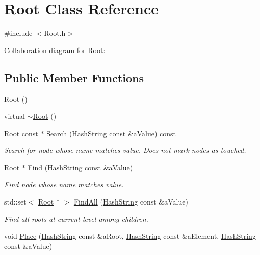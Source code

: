 \hypertarget{classRoot}{}\section{Root Class Reference}
\label{classRoot}


{\ttfamily \#include $<$Root.\+h$>$}



Collaboration diagram for Root\+:
\subsection*{Public Member Functions}
\begin{DoxyCompactItemize}
\item 
\hyperlink{classRoot_ae30f3c6144d2d9df894b392ee45d051f}{Root} ()
\item 
virtual \hyperlink{classRoot_ae3b9dd56ac40d582a92b904f8480be7b}{$\sim$\+Root} ()
\item 
\hyperlink{classRoot}{Root} const $\ast$ \hyperlink{classRoot_a47a028763d0583b91ec52e580f406548}{Search} (\hyperlink{classHashString}{Hash\+String} const \&a\+Value) const 
\begin{DoxyCompactList}\small\item\em Search for node whose name matches value. Does not mark nodes as touched. \end{DoxyCompactList}\item 
\hyperlink{classRoot}{Root} $\ast$ \hyperlink{classRoot_a3a960a09ba20ccf27233a22a63d863ec}{Find} (\hyperlink{classHashString}{Hash\+String} const \&a\+Value)
\begin{DoxyCompactList}\small\item\em Find node whose name matches value. \end{DoxyCompactList}\item 
std\+::set$<$ \hyperlink{classRoot}{Root} $\ast$ $>$ \hyperlink{classRoot_ade779f92135be7c3661fa7dee8c9b91c}{Find\+All} (\hyperlink{classHashString}{Hash\+String} const \&a\+Value)
\begin{DoxyCompactList}\small\item\em Find all roots at current level among children. \end{DoxyCompactList}\item 
void \hyperlink{classRoot_a0fe1c3f27c24117015025a191d4055e6}{Place} (\hyperlink{classHashString}{Hash\+String} const \&a\+Root, \hyperlink{classHashString}{Hash\+String} const \&a\+Element, \hyperlink{classHashString}{Hash\+String} const \&a\+Value)

\end{DoxyCompactItemize}
